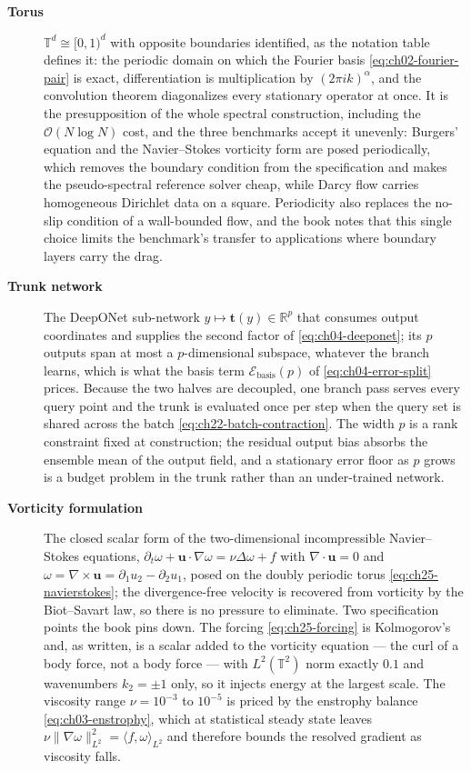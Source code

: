 \begin{description}
\item[\textbf{Torus}] $\mathbb{T}^{d} \cong [0,1)^{d}$ with opposite boundaries identified,
as the notation table defines it: the periodic domain on which the Fourier basis
\eqref{eq:ch02-fourier-pair} is exact, differentiation is multiplication by
$(2\pi i k)^{\alpha}$, and the convolution theorem diagonalizes every stationary operator at
once. It is the presupposition of the whole spectral construction, including the
$\mathcal{O}(N \log N)$ cost, and the three benchmarks accept it unevenly: Burgers' equation
and the Navier--Stokes vorticity form are posed periodically, which removes the boundary
condition from the specification and makes the pseudo-spectral reference solver cheap, while
Darcy flow carries homogeneous Dirichlet data on a square. Periodicity also replaces the
no-slip condition of a wall-bounded flow, and the book notes that this single choice limits
the benchmark's transfer to applications where boundary layers carry the drag.

\item[\textbf{Trunk network}] The DeepONet sub-network $y \mapsto \mathbf{t}(y) \in
\mathbb{R}^{p}$ that consumes output coordinates and supplies the second factor of
\eqref{eq:ch04-deeponet}; its $p$ outputs span at most a $p$-dimensional subspace, whatever
the branch learns, which is what the basis term $\mathcal{E}_{\text{basis}}(p)$ of
\eqref{eq:ch04-error-split} prices. Because the two halves are decoupled, one branch pass
serves every query point and the trunk is evaluated once per step when the query set is
shared across the batch \eqref{eq:ch22-batch-contraction}. The width $p$ is a rank
constraint fixed at construction; the residual output bias absorbs the ensemble mean of the
output field, and a stationary error floor as $p$ grows is a budget problem in the trunk
rather than an under-trained network. 

\item[\textbf{Vorticity formulation}] The closed scalar form of the two-dimensional
incompressible Navier--Stokes equations, $\partial_{t}\omega + \mathbf{u}\cdot\nabla\omega =
\nu\Delta\omega + f$ with $\nabla \cdot \mathbf{u} = 0$ and
$\omega = \nabla \times \mathbf{u} = \partial_{1} u_{2} - \partial_{2} u_{1}$, posed on the
doubly periodic torus \eqref{eq:ch25-navierstokes}; the divergence-free velocity is
recovered from vorticity by the Biot--Savart law, so there is no pressure to eliminate. Two
specification points the book pins down. The forcing \eqref{eq:ch25-forcing} is Kolmogorov's
and, as written, is a scalar added to the vorticity equation --- the curl of a body force,
not a body force --- with $L^{2}(\mathbb{T}^{2})$ norm exactly $0.1$ and wavenumbers
$k_{2} = \pm 1$ only, so it injects energy at the largest scale. The viscosity range
$\nu = 10^{-3}$ to $10^{-5}$ is priced by the enstrophy balance \eqref{eq:ch03-enstrophy},
which at statistical steady state leaves $\nu\|\nabla\omega\|_{L^{2}}^{2} =
\langle f, \omega \rangle_{L^{2}}$ and therefore bounds the resolved gradient as viscosity
falls. 


\end{description}
